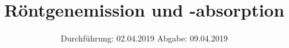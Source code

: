 

\subject{Nr. 602}
\title{Röntgenemission und -absorption}
\date{%
  Durchführung: 02.04.2019
  \hspace{3em}
  Abgabe: 09.04.2019
}



\maketitle
\thispagestyle{empty}
\tableofcontents
\newpage






\printbibliography{}


